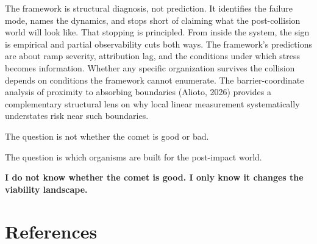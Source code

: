 \documentclass[11pt]{article}
\begin{document}
The framework is structural diagnosis, not prediction. It identifies the failure mode, names the dynamics, and stops short of claiming what the post-collision world will look like. That stopping is principled. From inside the system, the sign is empirical and partial observability cuts both ways. The framework's predictions are about ramp severity, attribution lag, and the conditions under which stress becomes information. Whether any specific organization survives the collision depends on conditions the framework cannot enumerate. The barrier-coordinate analysis of proximity to absorbing boundaries (Alioto, 2026) provides a complementary structural lens on why local linear measurement systematically understates risk near such boundaries.

The question is not whether the comet is good or bad.

The question is which organisms are built for the post-impact world.

\begin{pullquote}
\textbf{I do not know whether the comet is good. I only know it changes the viability landscape.}
\end{pullquote}

\section*{References}
\end{document}
